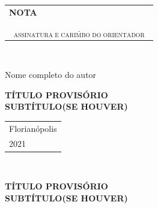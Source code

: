 \documentclass[12pt,a4paper]{article}
\begin{document}
\thispagestyle{empty}
\begin{table}
    \begin{flushright}
        \renewcommand{\arraystretch}{0}
        \begin{Form}
            \begin{tabular}{l}
                \hspace{2.5cm} \textbf{NOTA}\\
                $\underset{\text{ASSINATURA E CARIMBO DO ORIENTADOR}}{\underline{\hspace{7cm}}}$
            \end{tabular}
        \end{Form}
    \end{flushright}
\end{table}
~
\vspace{0.5cm}

\begin{center}
    \large Nome completo do autor
\end{center}

\vspace{5cm}

\begin{center}
    \centering
    \begin{large}
        \textbf{TÍTULO PROVISÓRIO} \\
        \textbf{SUBTÍTULO(SE HOUVER)}
    \end{large}
\end{center}

\vfill

\begin{center}
    \begin{large}
        \begin{tabular}{l}
            Florianópolis \\
            \hspace{0.65cm} 2021
    	\end{tabular}
    \end{large}
\end{center}
	
\newpage
\thispagestyle{empty}
~
\vspace{5cm}

\begin{center}
    \centering
    \begin{large}
        \textbf{TÍTULO PROVISÓRIO} \\
        \textbf{SUBTÍTULO(SE HOUVER)}
    \end{large}
\end{center}
\end{document}

